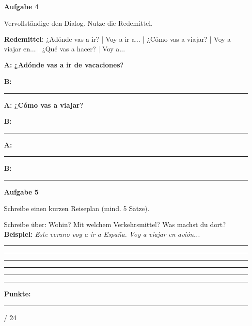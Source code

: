 \documentclass[11pt, a4paper]{article}
\newcommand{\fachfarbe}{spanisch}
\newcommand{\maxpunkte}{24}
\newcommand{\punktebox}[1]{\hfill\fbox{\small \_/#1}}
\newcommand{\luecke}[1]{\rule{#1}{0.4pt}}
\newcommand{\es}[1]{\textcolor{\fachfarbe}{\textbf{#1}}}
\newenvironment{aufgabe}[1]{%
    \needspace{5\baselineskip}%
    \nopagebreak[4]%
    \vspace{10pt}
    \noindent\textbf{\textcolor{\fachfarbe}{Aufgabe #1}}
    \nopagebreak[4]%
    \vspace{5pt}
    \nopagebreak[4]%
    \begin{list}{}{\leftmargin=0pt}
    \item[]
}{%
    \end{list}
}
\begin{document}

\begin{aufgabe}{4}
Vervollständige den Dialog. Nutze die Redemittel. \punktebox{6}
\end{aufgabe}

\begin{hinweis}
\textbf{Redemittel:} ¿Adónde vas a ir? | Voy a ir a... | ¿Cómo vas a viajar? | Voy a viajar en... | ¿Qué vas a hacer? | Voy a...
\end{hinweis}

\vspace{0.5em}

\noindent
\textbf{A:} \es{¿Adónde vas a ir de vacaciones?}

\textbf{B:} \luecke{8cm}

\textbf{A:} \es{¿Cómo vas a viajar?}

\textbf{B:} \luecke{8cm}

\textbf{A:} \luecke{6cm}

\textbf{B:} \luecke{8cm}

\vspace{15pt}


\begin{aufgabe}{5}
Schreibe einen kurzen Reiseplan (mind. 5 Sätze). \punktebox{3}
\end{aufgabe}

\begin{hinweis}
Schreibe über: Wohin? Mit welchem Verkehrsmittel? Was machst du dort?\\
\textbf{Beispiel:} \textit{Este verano voy a ir a España. Voy a viajar en avión...}
\end{hinweis}

\noindent\rule{\textwidth}{0.4pt}\vspace{8pt}
\noindent\rule{\textwidth}{0.4pt}\vspace{8pt}
\noindent\rule{\textwidth}{0.4pt}\vspace{8pt}
\noindent\rule{\textwidth}{0.4pt}\vspace{8pt}
\noindent\rule{\textwidth}{0.4pt}\vspace{8pt}

\vspace{20pt}
\hrule
\vspace{10pt}

\begin{flushright}
\textbf{Punkte:} \luecke{1cm} / \maxpunkte
\end{flushright}
\end{document}
